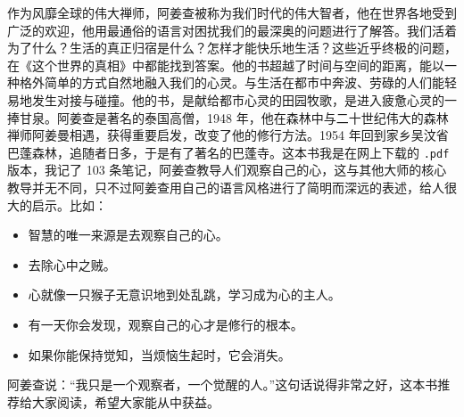 \begin{book}
    作为风靡全球的伟大禅师，阿姜查被称为我们时代的伟大智者，他在世界各地受到广泛的欢迎，他用最通俗的语言对困扰我们的最深奥的问题进行了解答。我们活着为了什么？生活的真正归宿是什么？怎样才能快乐地生活？这些近乎终极的问题，在《这个世界的真相》中都能找到答案。他的书超越了时间与空间的距离，能以一种格外简单的方式自然地融入我们的心灵。与生活在都市中奔波、劳碌的人们能轻易地发生对接与碰撞。他的书，是献给都市心灵的田园牧歌，是进入疲惫心灵的一捧甘泉。阿姜查是著名的泰国高僧，1948 年，他在森林中与二十世纪伟大的森林禅师阿姜曼相遇，获得重要启发，改变了他的修行方法。1954 年回到家乡吴汶省巴蓬森林，追随者日多，于是有了著名的巴蓬寺。这本书我是在网上下载的 \texttt{.pdf} 版本，我记了 103 条笔记，阿姜查教导人们观察自己的心，这与其他大师的核心教导并无不同，只不过阿姜查用自己的语言风格进行了简明而深远的表述，给人很大的启示。比如：\begin{itemize}
        \item 智慧的唯一来源是去观察自己的心。
        \item 去除心中之贼。
        \item 心就像一只猴子无意识地到处乱跳，学习成为心的主人。
        \item 有一天你会发现，观察自己的心才是修行的根本。
        \item 如果你能保持觉知，当烦恼生起时，它会消失。
    \end{itemize} 阿姜查说：“我只是一个观察者，一个觉醒的人。”这句话说得非常之好，这本书推荐给大家阅读，希望大家能从中获益。
\end{book}

